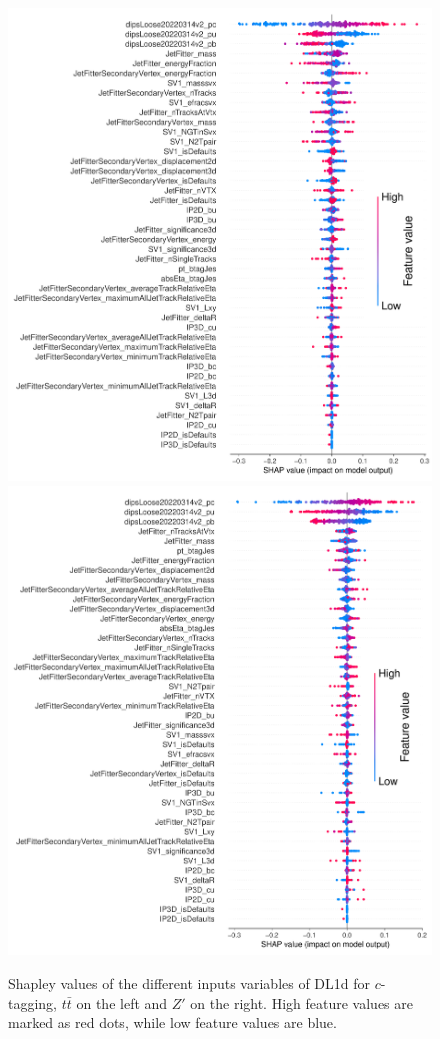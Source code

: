 \begin{figure}
  \centering
  \includegraphics[scale=0.7]{Images/FTAG/DL1d/Shap/ttc.png}
  \includegraphics[scale=0.7]{Images/FTAG/DL1d/Shap/zpc.png}
  \caption{Shapley values of the different inputs variables of DL1d for $c$-tagging, $t\bar{t}$ on the left and $Z'$ on the right. High feature values are marked as red dots, while low feature values are blue.} 
  \label{fig:DL1dshapc}
\end{figure} 

